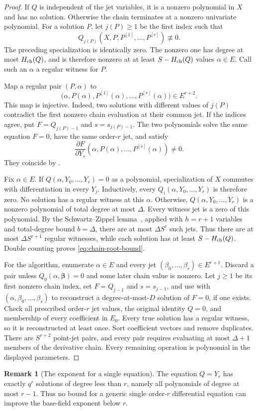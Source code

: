 \documentclass[11pt,letterpaper]{article}
\theoremstyle{definition}
\newtheorem{remark}[remark]{Remark}
\begin{document}
\begin{proof}
If $Q$ is independent of the jet variables, it is a nonzero polynomial in
$X$ and has no solution. Otherwise the chain terminates at a nonzero
univariate polynomial. For a solution $P$, let $j(P)\ge1$ be the first
index such that
\[
  Q_{j(P)}(X,P,P^{[1]},\ldots,P^{[r]})\not\equiv0.
\]
The preceding specialization is identically zero. The nonzero one has degree
at most $H_{\rm ch}(Q)$, and is therefore nonzero at at least
$S-H_{\rm ch}(Q)$ values $\alpha\in E$. Call such an $\alpha$ a regular
witness for $P$.

Map a regular pair $(P,\alpha)$ to
\[
  \bigl(\alpha,P(\alpha),P^{[1]}(\alpha),\ldots,P^{[r]}(\alpha)\bigr)
  \in E^{r+2}.
\]
This map is injective. Indeed, two solutions with different values of
$j(P)$ contradict the first nonzero chain evaluation at their common jet.
If the indices agree, put $F=Q_{j(P)-1}$ and $s=s_{j(P)-1}$. The two
polynomials solve the same equation $F=0$, have the same order-$r$ jet,
and satisfy
\[
  \frac{\partial F}{\partial Y_s}
  (\alpha,P(\alpha),\ldots,P^{[s]}(\alpha))\ne0.
\]
They coincide by .

Fix $\alpha\in E$.
If $Q(\alpha,Y_0,\ldots,Y_r)=0$ as a polynomial, specialization of $X$
commutes with differentiation in every $Y_j$. Inductively, every
$Q_i(\alpha,Y_0,\ldots,Y_r)$ is therefore zero.
No solution has a regular witness at this $\alpha$.
Otherwise, $Q(\alpha,Y_0,\ldots,Y_r)$ is a nonzero polynomial of total
degree at most $\Delta$. Every witness jet is a zero of this polynomial.
By the Schwartz--Zippel lemma~\cite{Schwartz80}, applied with
$h=r+1$ variables and total-degree bound $b=\Delta$, there are at most
$\Delta S^r$ such jets. Thus there are at most $\Delta S^{r+1}$ regular
witnesses, while each solution has at least $S-H_{\rm ch}(Q)$. Double
counting proves \eqref{eq:chain-root-bound}.

For the algorithm, enumerate $\alpha\in E$ and every jet
$(\beta_0,\ldots,\beta_r)\in E^{r+1}$. Discard a pair unless
$Q_0(\alpha,\boldsymbol\beta)=0$ and some later chain value is nonzero.
Let $j\ge1$ be its first nonzero chain index, set $F=Q_{j-1}$ and
$s=s_{j-1}$, and use  with
$(\alpha,\beta_0,\ldots,\beta_s)$ to reconstruct a degree-at-most-$D$
solution of $F=0$, if one exists. Check all prescribed order-$r$ jet values,
the original identity $Q=0$, and membership of every coefficient in $E_0$.
Every true solution has a regular witness, so it is reconstructed at least
once. Sort coefficient vectors and remove duplicates. There are $S^{r+2}$ point-jet pairs, and every
pair requires evaluating at most $\Delta+1$ members of the derivative
chain. Every remaining operation is polynomial in the displayed
parameters.
\end{proof}
 \begin{remark}[The exponent for a single equation]
\label{rem:root-exponent-optimal}
The equation $Q=Y_r$ has exactly $q^r$ solutions of degree less than $r$,
namely all polynomials of degree at most $r-1$. Thus no bound for a generic
single order-$r$ differential equation can improve the base-field exponent
below $r$.
\end{remark}
\end{document}
